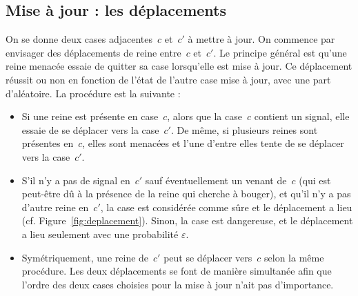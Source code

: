 \subsection{Mise à jour : les déplacements}

On se donne deux cases adjacentes~$c$ et~$c'$ à mettre à jour. On commence par envisager des déplacements de reine entre~$c$ et~$c'$. Le principe général est qu'une reine menacée essaie de quitter sa case lorsqu'elle est mise à jour. Ce déplacement réussit ou non en fonction de l'état de l'autre case mise à jour, avec une part d'aléatoire. La procédure est la suivante :

\begin{itemize}

\item{ Si une reine est présente en case~$c$, alors que la case~$c$ contient un signal, elle essaie de se déplacer vers la case~$c'$. De même, si plusieurs reines sont présentes en~$c$, elles sont menacées et l'une d'entre elles tente de se déplacer vers la case~$c'$.}

\item{ S'il n'y a pas de signal en~$c'$ sauf éventuellement un venant de~$c$ (qui est peut-être dû à la présence de la reine qui cherche à bouger), et qu'il n'y a pas d'autre reine en~$c'$, la case est considérée comme sûre et le déplacement a lieu (cf. Figure~\ref{fig:deplacement}). Sinon, la case est dangereuse, et le déplacement a lieu seulement avec une probabilité $\varepsilon$.
}

\item{ Symétriquement, une reine de~$c'$ peut se déplacer vers~$c$ selon la même procédure. Les deux déplacements se font de manière simultanée afin que l'ordre des deux cases choisies pour la mise à jour n'ait pas d'importance.}

\end{itemize}


